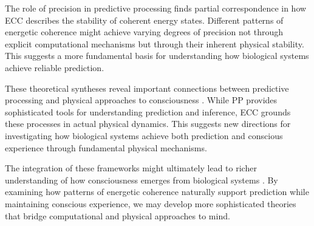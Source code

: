 The role of precision in predictive processing \cite{Hohwy2008} finds partial correspondence in how ECC describes the stability of coherent energy states. Different patterns of energetic coherence might achieve varying degrees of precision not through explicit computational mechanisms but through their inherent physical stability. This suggests a more fundamental basis for understanding how biological systems achieve reliable prediction.

These theoretical syntheses reveal important connections between predictive processing and physical approaches to consciousness \cite{Seth2014}. While PP provides sophisticated tools for understanding prediction and inference, ECC grounds these processes in actual physical dynamics. This suggests new directions for investigating how biological systems achieve both prediction and conscious experience through fundamental physical mechanisms.

The integration of these frameworks might ultimately lead to richer understanding of how consciousness emerges from biological systems \cite{Clark2013}. By examining how patterns of energetic coherence naturally support prediction while maintaining conscious experience, we may develop more sophisticated theories that bridge computational and physical approaches to mind.